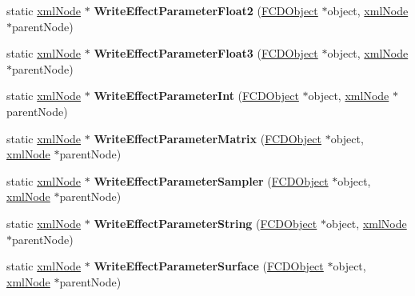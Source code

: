 \begin{DoxyCompactItemize}
\item 
\hypertarget{classFArchiveXML_a78c5460e56cf167cdd13430e40a6f446}{
static \hyperlink{struct__xmlNode}{xmlNode} $\ast$ {\bfseries WriteEffectParameterFloat2} (\hyperlink{classFCDObject}{FCDObject} $\ast$object, \hyperlink{struct__xmlNode}{xmlNode} $\ast$parentNode)}
\label{classFArchiveXML_a78c5460e56cf167cdd13430e40a6f446}

\item 
\hypertarget{classFArchiveXML_a2fe5995652c9d7f0e87478c2df247d19}{
static \hyperlink{struct__xmlNode}{xmlNode} $\ast$ {\bfseries WriteEffectParameterFloat3} (\hyperlink{classFCDObject}{FCDObject} $\ast$object, \hyperlink{struct__xmlNode}{xmlNode} $\ast$parentNode)}
\label{classFArchiveXML_a2fe5995652c9d7f0e87478c2df247d19}

\item 
\hypertarget{classFArchiveXML_a759d33b6880a60cf180fee446a2a1604}{
static \hyperlink{struct__xmlNode}{xmlNode} $\ast$ {\bfseries WriteEffectParameterInt} (\hyperlink{classFCDObject}{FCDObject} $\ast$object, \hyperlink{struct__xmlNode}{xmlNode} $\ast$parentNode)}
\label{classFArchiveXML_a759d33b6880a60cf180fee446a2a1604}

\item 
\hypertarget{classFArchiveXML_af20dbc06500fc9db1a0401dad4b0e277}{
static \hyperlink{struct__xmlNode}{xmlNode} $\ast$ {\bfseries WriteEffectParameterMatrix} (\hyperlink{classFCDObject}{FCDObject} $\ast$object, \hyperlink{struct__xmlNode}{xmlNode} $\ast$parentNode)}
\label{classFArchiveXML_af20dbc06500fc9db1a0401dad4b0e277}

\item 
\hypertarget{classFArchiveXML_a172090be69e194517e618dac85125112}{
static \hyperlink{struct__xmlNode}{xmlNode} $\ast$ {\bfseries WriteEffectParameterSampler} (\hyperlink{classFCDObject}{FCDObject} $\ast$object, \hyperlink{struct__xmlNode}{xmlNode} $\ast$parentNode)}
\label{classFArchiveXML_a172090be69e194517e618dac85125112}

\item 
\hypertarget{classFArchiveXML_afbbe4bd7c806738f10b0983dc3dcfb1e}{
static \hyperlink{struct__xmlNode}{xmlNode} $\ast$ {\bfseries WriteEffectParameterString} (\hyperlink{classFCDObject}{FCDObject} $\ast$object, \hyperlink{struct__xmlNode}{xmlNode} $\ast$parentNode)}
\label{classFArchiveXML_afbbe4bd7c806738f10b0983dc3dcfb1e}

\item 
\hypertarget{classFArchiveXML_ab36dc90780f7e11286440560e65d6c10}{
static \hyperlink{struct__xmlNode}{xmlNode} $\ast$ {\bfseries WriteEffectParameterSurface} (\hyperlink{classFCDObject}{FCDObject} $\ast$object, \hyperlink{struct__xmlNode}{xmlNode} $\ast$parentNode)}
\label{classFArchiveXML_ab36dc90780f7e11286440560e65d6c10}


\end{DoxyCompactItemize}
